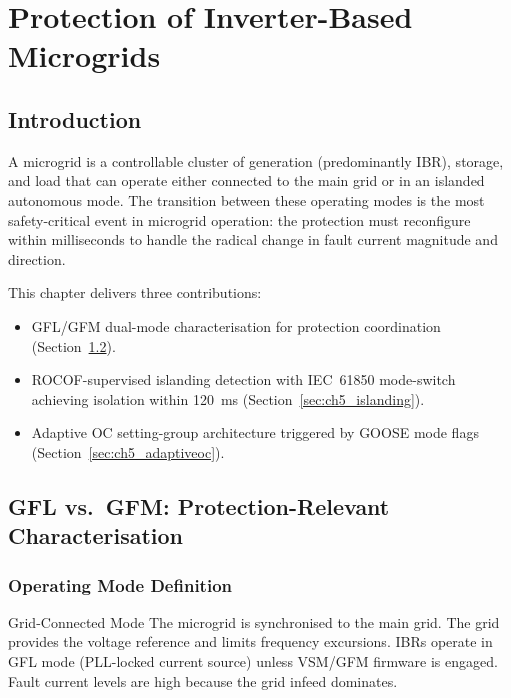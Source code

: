 \chapter{Protection of Inverter-Based Microgrids}
\label{ch:microgrid}

\section{Introduction}
\label{sec:ch5mg_intro}

A microgrid is a controllable cluster of generation (predominantly IBR),
storage, and load that can operate either connected to the main grid or
in an islanded autonomous mode. The transition between these operating modes
is the most safety-critical event in microgrid operation: the protection
must reconfigure within milliseconds to handle the radical change in fault
current magnitude and direction.

This chapter delivers three contributions:
\begin{itemize}
\item GFL/GFM dual-mode characterisation for protection
      coordination (Section~\ref{sec:ch5_characterisation}).
\item ROCOF-supervised islanding detection with IEC~61850
      mode-switch achieving isolation within 120~ms
      (Section~\ref{sec:ch5_islanding}).
\item Adaptive OC setting-group architecture triggered by
      GOOSE mode flags (Section~\ref{sec:ch5_adaptiveoc}).
\end{itemize}

\section{GFL vs.\ GFM: Protection-Relevant Characterisation}
\label{sec:ch5_characterisation}

\subsection{Operating Mode Definition}

\begin{thesisdef}{Grid-Connected Mode}
The microgrid is synchronised to the main grid. The grid provides the
voltage reference and limits frequency excursions. IBRs operate in GFL
mode (PLL-locked current source) unless VSM/GFM firmware is engaged.
Fault current levels are high because the grid infeed dominates.
\end{thesisdef}

